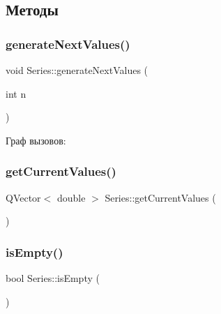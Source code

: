 \subsection{Методы}
\mbox{\label{class_series_a2274def40fd4c03eba80a8735b885dfb}} 
\subsubsection{\texorpdfstring{generate\+Next\+Values()}{generateNextValues()}}
{\footnotesize\ttfamily void Series\+::generate\+Next\+Values (\begin{DoxyParamCaption}\item[{int}]{n }\end{DoxyParamCaption})}

Граф вызовов\+:
\mbox{\label{class_series_a2c20b127e35a3aac8207cecc270ead7e}} 
\subsubsection{\texorpdfstring{get\+Current\+Values()}{getCurrentValues()}}
{\footnotesize\ttfamily Q\+Vector$<$ double $>$ Series\+::get\+Current\+Values (\begin{DoxyParamCaption}{ }\end{DoxyParamCaption})}

\mbox{\label{class_series_a1969cc0c07e2d0196e483f5e11f9d2db}} 
\subsubsection{\texorpdfstring{is\+Empty()}{isEmpty()}}
{\footnotesize\ttfamily bool Series\+::is\+Empty (\begin{DoxyParamCaption}{ }\end{DoxyParamCaption})}

\mbox{\label{class_series_ab82d47cc93612b82c3621b89d7cbd511}} 

